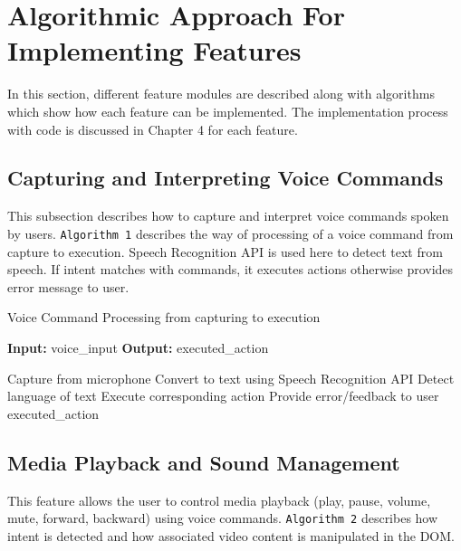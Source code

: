 \section{Algorithmic Approach For Implementing Features}
In this section, different feature modules are described along with algorithms which show how each feature can be implemented. The implementation process with code is discussed in Chapter 4 for each feature.

\subsection{Capturing and Interpreting Voice Commands}
This subsection describes how to capture and interpret voice commands spoken by users. \texttt{Algorithm 1} describes the way of  processing of a voice command from capture to execution. Speech Recognition API is used here to detect text from speech. If intent matches with commands, it executes actions otherwise provides error message to user.

\begin{algorithm}[H] 
    \caption{Voice Command Processing from capturing to execution}
    \label{alg:voice_command_processing}
    \textbf{Input:} voice\_input
    \textbf{Output:} executed\_action
    \begin{algorithmic}[1] %
        \State Capture  from microphone
        \State Convert  to text using Speech Recognition API
        \State Detect language of text
            \State Execute corresponding action
        \Else
            \State Provide error/feedback to user
        \EndIf
        \State \Return executed\_action
    \end{algorithmic}
\end{algorithm}


\subsection{Media Playback and Sound Management}

This feature allows the user to control media playback (play, pause, volume, mute, forward, backward) using voice commands. \texttt{Algorithm 2} describes how intent is detected and how associated video content is manipulated in the DOM.

